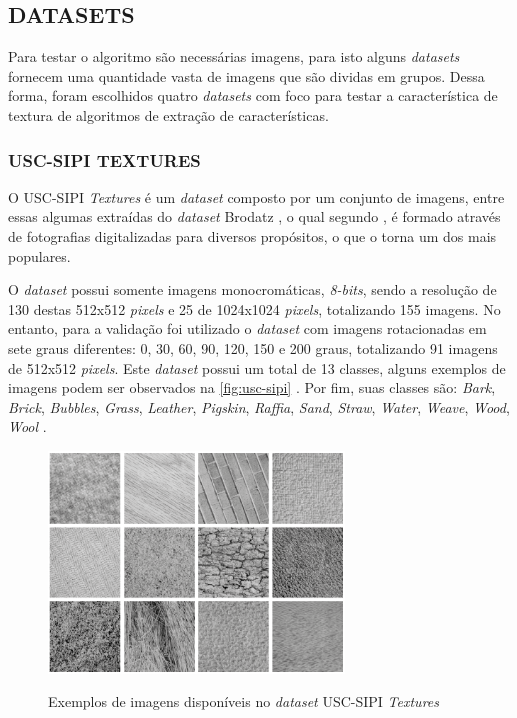\subsection{DATASETS}
\label{subsec:datasets}

\par Para testar o algoritmo são necessárias imagens, para isto alguns \textit{datasets} fornecem uma quantidade vasta de imagens que são dividas em grupos. Dessa forma, foram escolhidos quatro \textit{datasets} com foco para testar a característica de textura de algoritmos de extração de características.

\subsubsection{USC-SIPI TEXTURES}
\label{subsubsec:usc-spi}

\par O USC-SIPI \textit{Textures} \cite{weber1997usc} é um \textit{dataset} composto por um conjunto de imagens, entre essas algumas extraídas do \textit{dataset} Brodatz \cite{brodatz1966textures}, o qual segundo , é formado através de fotografias digitalizadas para diversos propósitos, o que o torna um dos mais populares.
\par O \textit{dataset} possui somente imagens monocromáticas, \textit{8-bits}, sendo a resolução de 130 destas 512x512 \textit{pixels} e 25 de 1024x1024 \textit{pixels}, totalizando 155 imagens. No entanto, para a validação foi utilizado o \textit{dataset} com imagens rotacionadas em sete graus diferentes: 0, 30, 60, 90, 120, 150 e 200 graus, totalizando 91 imagens de 512x512 \textit{pixels}. Este \textit{dataset} possui um total de 13 classes, alguns exemplos de imagens podem ser observados na \autoref{fig:usc-sipi} \cite{weber1997usc}. Por fim, suas classes são: \textit{Bark}, \textit{Brick}, \textit{Bubbles}, \textit{Grass}, \textit{Leather}, \textit{Pigskin}, \textit{Raffia}, \textit{Sand}, \textit{Straw},
\textit{Water}, \textit{Weave}, \textit{Wood}, \textit{Wool} \cite{weber1997usc}.

\begin{figure}[!h]
    \centering
    \caption{Exemplos de imagens disponíveis no \textit{dataset} USC-SIPI \textit{Textures}}
    \includegraphics[width=0.7\textwidth]{./dados/figuras/usc-sipi.png}
    \label{fig:usc-sipi}
\end{figure}

